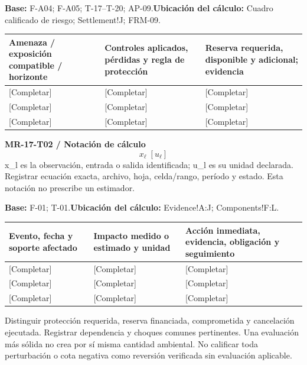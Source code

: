 \textbf{Base:} F-A04; F-A05; T-17–T-20; AP-09.\quad\textbf{Ubicación del cálculo:} Cuadro calificado de riesgo; Settlement!J; FRM-09.\par\endgroup
{\sffamily\fontsize{8.6}{10.7}\selectfont\begin{longtable}{@{}P{48mm}P{61mm}P{53mm}@{}}
\toprule
\textbf{Amenaza / exposición compatible / horizonte} & \textbf{Controles aplicados, pérdidas y regla de protección} & \textbf{Reserva requerida, disponible y adicional; evidencia}\\\midrule\endhead
\rule{0pt}{8mm}[Completar] & [Completar] & [Completar]\\\hline
\rule{0pt}{8mm}[Completar] & [Completar] & [Completar]\\\hline
\rule{0pt}{8mm}[Completar] & [Completar] & [Completar]\\\hline
\end{longtable}}
\par\begingroup\sffamily\fontsize{8.4}{10.5}\selectfont\color{NEBGreen}
\textbf{MR-17-T02 / Notación de cálculo}\
{\fontsize{10}{12}\selectfont\[x_{\ell}\;[u_{\ell}]\]}
x\_l es la observación, entrada o salida identificada; u\_l es su unidad declarada. Registrar ecuación exacta, archivo, hoja, celda/rango, período y estado. Esta notación no prescribe un estimador.\par
\textbf{Base:} F-01; T-01.\quad\textbf{Ubicación del cálculo:} Evidence!A:J; Components!F:L.\par\endgroup
{\sffamily\fontsize{8.6}{10.7}\selectfont\begin{longtable}{@{}P{48mm}P{61mm}P{53mm}@{}}
\toprule
\textbf{Evento, fecha y soporte afectado} & \textbf{Impacto medido o estimado y unidad} & \textbf{Acción inmediata, evidencia, obligación y seguimiento}\\\midrule\endhead
\rule{0pt}{8mm}[Completar] & [Completar] & [Completar]\\\hline
\rule{0pt}{8mm}[Completar] & [Completar] & [Completar]\\\hline
\rule{0pt}{8mm}[Completar] & [Completar] & [Completar]\\\hline
\end{longtable}}
Distinguir protección requerida, reserva financiada, comprometida y cancelación ejecutada. Registrar dependencia y choques comunes pertinentes. Una evaluación más sólida no crea por sí misma cantidad ambiental. No calificar toda perturbación o cota negativa como reversión verificada sin evaluación aplicable.\par
